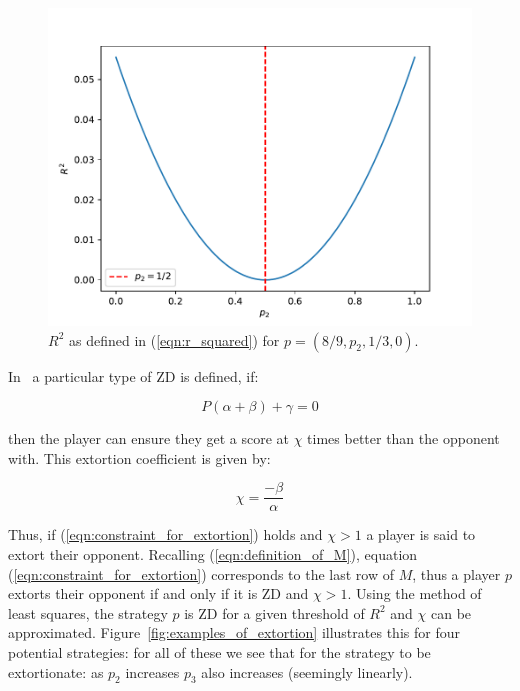 \documentclass[a4paper]{article}
\begin{document}
\begin{figure}[!htbp]
    \begin{center}
    \includegraphics[width=.6\textwidth]{assets/img/R_squared_for_varying_p2_for_extort2/main.pdf}
    \caption{\(R^2\) as defined in (\ref{eqn:r_squared}) for \(p=(8/9, p_2, 1/3,
    0)\).}
    \label{fig:R_squared_for_varying_p2_for_extort2}
    \end{center}
\end{figure}

In~\cite{Press2012} a particular type of ZD is defined, if:

\begin{equation}\label{eqn:constraint_for_extortion}
    P(\alpha + \beta)+\gamma=0
\end{equation}

then the player can ensure they get a score at \(\chi\) times
better than the opponent with. This extortion coefficient is given by:

\begin{equation}\label{eqn:definition_of_chi}
    \chi=\frac{-\beta}{\alpha} 
\end{equation}

Thus, if (\ref{eqn:constraint_for_extortion}) holds and \(\chi >1\) a player is
said to extort their opponent. Recalling (\ref{eqn:definition_of_M}), equation
(\ref{eqn:constraint_for_extortion}) corresponds to the last row of \(M\), thus
a player \(p\) extorts their opponent if and only if it is ZD and \(\chi > 1\).
Using the method of least squares, the strategy \(p\) is ZD for a given
threshold of \(R^2\) and \(\chi\) can be approximated.
Figure~\ref{fig:examples_of_extortion} illustrates this for four potential
strategies: for all of these we see that for the strategy to be extortionate: as
\(p_2\) increases \(p_3\) also increases (seemingly linearly).
\end{document}
